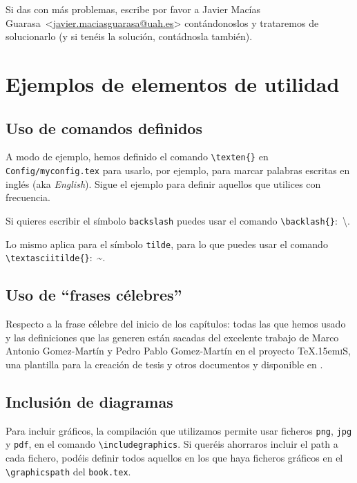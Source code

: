 \documentclass[spanish,openright]{book}
\makeatletter
\def\texis{\TeX \raise.15em\hbox{\textsc{i}}S}
\newcommand{\myAuthorName}{Javier}
\newcommand{\myAuthorSurname}{Macías Guarasa}
\newcommand{\myAuthorFullName}{\myAuthorName{} \myAuthorSurname{}}
\newcommand{\myAuthorEmail}{javier.maciasguarasa@uah.es}
\DeclareRobustCommand{\texten}[1]{\textit{#1}}
\newcommand{\contactauthor}{\myAuthorFullName~\textless\href{mailto:\myAuthorEmail}{\myAuthorEmail}\textgreater}
\makeatother
\begin{document}
Si das con más problemas, escribe por favor a \contactauthor
contándonoslos y trataremos de solucionarlo (y si tenéis la solución,
contádnosla también).


\section{Ejemplos de elementos de utilidad}
\label{sec:ejempl-de-elem}

\subsection{Uso de comandos definidos}
\label{sec:uso-de-comandos}

A modo de ejemplo, hemos definido el comando
\texttt{\textbackslash{}texten\{\}} en \texttt{Config/myconfig.tex} para
usarlo, por ejemplo, para marcar palabras escritas en inglés (aka
\texten{English}). Sigue el ejemplo para definir aquellos que utilices
con frecuencia.

Si quieres escribir el símbolo \texttt{backslash} puedes usar el comando
\texttt{\textbackslash{}backlash\{\}}:~\textbackslash{}.

Lo mismo aplica para el símbolo \texttt{tilde}, para lo que puedes usar
el comando \texttt{\textbackslash{}textasciitilde\{\}}:~\textasciitilde{}.


\subsection{Uso de ``frases célebres''}
\label{sec:uso-de-frases}

Respecto a la frase célebre del inicio de los capítulos: todas las que
hemos usado y las definiciones que las generen están sacadas del
excelente trabajo de Marco Antonio Gomez-Martín y Pedro Pablo
Gomez-Martín en el proyecto \texis, una plantilla para la creación de
tesis y otros documentos y disponible en \cite{texis}.


\subsection{Inclusión de diagramas}
\label{sec:diagrama}

Para incluir gráficos, la compilación que utilizamos permite usar
ficheros \texttt{png}, \texttt{jpg} y \texttt{pdf}, en el comando
\texttt{\textbackslash{}includegraphics}. Si queréis ahorraros incluir
el path a cada fichero, podéis definir todos aquellos en los que haya
ficheros gráficos en el \texttt{\textbackslash{}graphicspath} del
\texttt{book.tex}.
\end{document}
